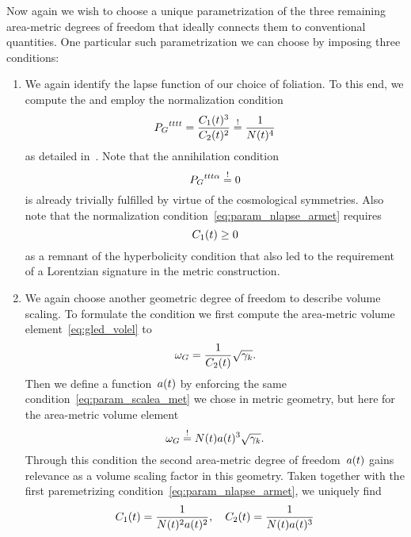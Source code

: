 Now again we wish to choose a unique parametrization of the three remaining area-metric degrees of freedom that ideally connects them to conventional quantities. One particular such parametrization we can choose by imposing three conditions:
\begin{enumerate}
	\item We again identify the lapse function of our choice of foliation. To this end, we compute the  and employ the normalization condition
		\begin{equation}\label{eq:param_nlapse_armet}
			{P_G}^{tttt}=\frac{C_1(t)^3}{C_2(t)^2}\overset{!}{=}\frac{1}{N(t)^4}
		\end{equation}
		as detailed in~\autocite{Schuller2016}. Note that the annihilation condition
		\begin{equation}
			{P_G}^{ttt\alpha}\overset{!}{=}0
		\end{equation}
		is already trivially fulfilled by virtue of the cosmological symmetries. Also note that the normalization condition~\eqref{eq:param_nlapse_armet} requires
		\begin{equation}
			C_1(t)\geq 0
		\end{equation}
		as a remnant of the hyperbolicity condition that also led to the requirement of a Lorentzian signature in the metric construction.
	\item We again choose another geometric degree of freedom to describe volume scaling. To formulate the condition we first compute the area-metric volume element~\eqref{eq:gled_volel} to
		\begin{equation}
			\omega_G=\frac{1}{C_2(t)}\sqrt{{\gamma_{k}}}
			\mathpunct{.}
		\end{equation}
		Then we define a function~$a(t)$ by enforcing the same condition~\eqref{eq:param_scalea_met} we chose in metric geometry, but here for the area-metric volume element
		\begin{equation}\label{eq:param_scalea_armet}
			\omega_G\overset{!}{=}N(t)a(t)^3\sqrt{{\gamma_{k}}}
			\mathpunct{.}
		\end{equation}
		Through this condition the second area-metric degree of freedom~$a(t)$ gains relevance as a volume scaling factor in this geometry. Taken together with the first paremetrizing condition~\eqref{eq:param_nlapse_armet}, we uniquely find
		\begin{align}\label{eq:armet_c12}
			\Const_1\oft=\frac{1}{\Nlapse\oft^2\scalea\oft^2}\eqpunct{,} \quad \Const_2\oft=\frac{1}{\Nlapse\oft\scalea\oft^3}

\end{align}
\end{enumerate}
